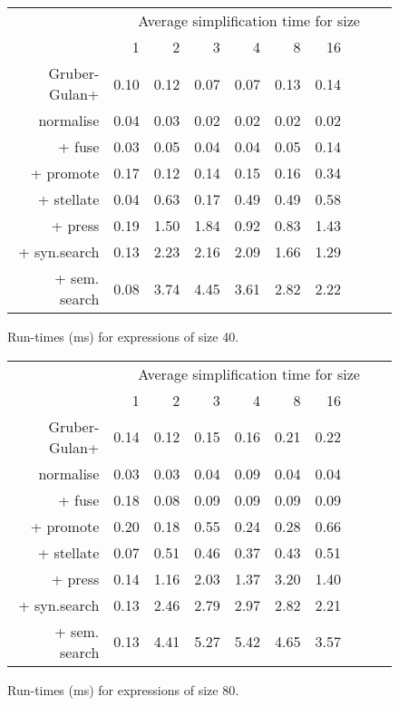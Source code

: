 \begin{figure}\begin{tabular}{rrrrrrrrrr}
 & \multicolumn{9}{c}{Average simplification time for size} \\
 & 1 & 2 & 3 & 4 & 8 & 16 \\
Gruber-Gulan+ & 0.10 & 0.12 & 0.07 & 0.07 & 0.13 & 0.14 \\
normalise & 0.04 & 0.03 & 0.02 & 0.02 & 0.02 & 0.02 \\
+ fuse & 0.03 & 0.05 & 0.04 & 0.04 & 0.05 & 0.14 \\
+ promote & 0.17 & 0.12 & 0.14 & 0.15 & 0.16 & 0.34 \\
+ stellate & 0.04 & 0.63 & 0.17 & 0.49 & 0.49 & 0.58 \\
+ press & 0.19 & 1.50 & 1.84 & 0.92 & 0.83 & 1.43 \\
+ syn.search & 0.13 & 2.23 & 2.16 & 2.09 & 1.66 & 1.29 \\
+ sem. search & 0.08 & 3.74 & 4.45 & 3.61 & 2.82 & 2.22 \\
\end{tabular}\caption{Run-times (ms) for expressions of size 40.}\end{figure}
\begin{figure}\begin{tabular}{rrrrrrrrrr}
 & \multicolumn{9}{c}{Average simplification time for size} \\
 & 1 & 2 & 3 & 4 & 8 & 16 \\
Gruber-Gulan+ & 0.14 & 0.12 & 0.15 & 0.16 & 0.21 & 0.22 \\
normalise & 0.03 & 0.03 & 0.04 & 0.09 & 0.04 & 0.04 \\
+ fuse & 0.18 & 0.08 & 0.09 & 0.09 & 0.09 & 0.09 \\
+ promote & 0.20 & 0.18 & 0.55 & 0.24 & 0.28 & 0.66 \\
+ stellate & 0.07 & 0.51 & 0.46 & 0.37 & 0.43 & 0.51 \\
+ press & 0.14 & 1.16 & 2.03 & 1.37 & 3.20 & 1.40 \\
+ syn.search & 0.13 & 2.46 & 2.79 & 2.97 & 2.82 & 2.21 \\
+ sem. search & 0.13 & 4.41 & 5.27 & 5.42 & 4.65 & 3.57 \\
\end{tabular}\caption{Run-times (ms) for expressions of size 80.}\end{figure}
